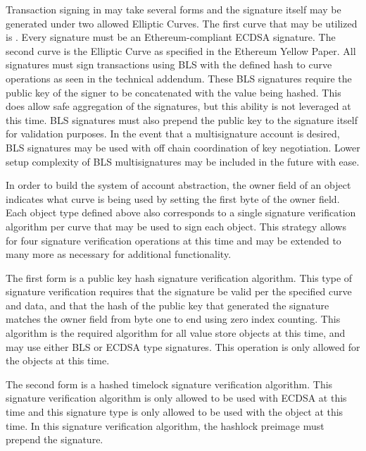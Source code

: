 Transaction signing in \LayerTwo{} may take several forms and the
signature itself may be generated under two allowed Elliptic Curves.
The first curve that may be utilized is \secp{}.
Every \secp{} signature must be an Ethereum-compliant ECDSA signature.
The second curve is the \bnEth{} Elliptic Curve as specified in the
Ethereum Yellow Paper.
All \bnEth{} signatures must sign transactions using BLS with the defined
hash to curve operations as seen in the technical addendum.
These BLS signatures require the public key of the signer to be
concatenated with the value being hashed.
This does allow safe aggregation of the signatures, but this ability is
not leveraged at this time.
BLS signatures must also prepend the public key to the signature itself
for validation purposes.
In the event that a multisignature account is desired, BLS signatures
may be used with off chain coordination of key negotiation.
Lower setup complexity of BLS multisignatures may be included in the
future with ease.

In order to build the system of account abstraction, the owner field of
an object indicates what curve is being used by setting the first byte
of the owner field.
Each object type defined above also corresponds to a single signature
verification algorithm per curve that may be used to sign each object.
This strategy allows for four signature verification operations at this
time and may be extended to many more as necessary for additional
functionality.

The first form is a public key hash signature verification algorithm.
This type of signature verification requires that the signature be
valid per the specified curve and data, and that the hash of the public
key that generated the signature matches the owner field from byte one
to end using zero index counting.
This algorithm is the required algorithm for all value store objects at
this time, and may use either BLS or ECDSA type signatures.
This operation is only allowed for the \ValueStore{} objects at this time.

The second form is a hashed timelock signature verification algorithm.
This signature verification algorithm is only allowed to be used with
ECDSA at this time and this signature type is only allowed to be used
with the \AtomicSwap{} object at this time.
In this signature verification algorithm, the hashlock preimage must
prepend the signature.

